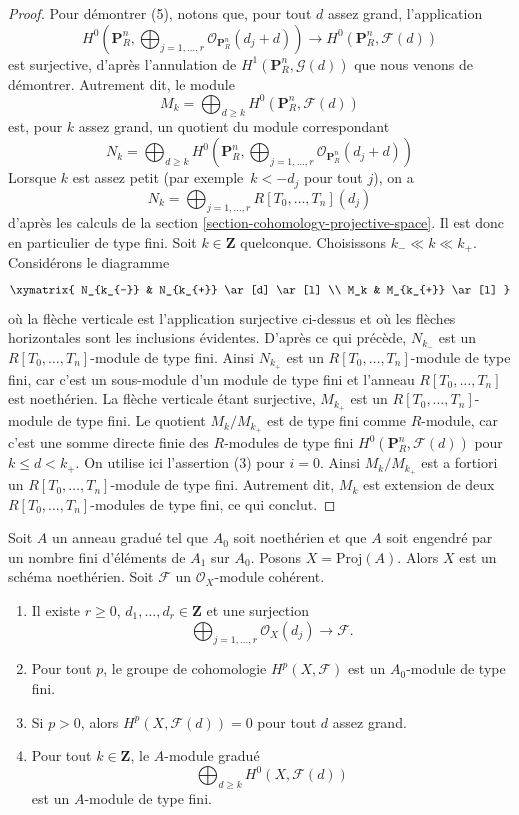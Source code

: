 \begin{proof}
\medskip\noindent
Pour démontrer (5), notons que, pour tout $d$
assez grand, l'application
$$
H^0(\mathbf{P}^n_R, \bigoplus\nolimits_{j = 1, \ldots, r}
\mathcal{O}_{\mathbf{P}^n_R}(d_j + d))
\to
H^0(\mathbf{P}^n_R, \mathcal{F}(d))
$$
est surjective, d'après l'annulation de $H^1(\mathbf{P}^n_R, \mathcal{G}(d))$
que nous venons de démontrer. Autrement dit, le module
$$
M_k
=
\bigoplus\nolimits_{d \geq k} H^0(\mathbf{P}^n_R, \mathcal{F}(d))
$$
est, pour $k$ assez grand, un quotient du module correspondant
$$
N_k
=
\bigoplus\nolimits_{d \geq k} H^0(\mathbf{P}^n_R,
\bigoplus\nolimits_{j = 1, \ldots, r}
\mathcal{O}_{\mathbf{P}^n_R}(d_j + d)
)
$$
Lorsque $k$ est assez petit (par exemple\ $k < -d_j$ pour tout $j$), on a
$$
N_k = \bigoplus\nolimits_{j = 1, \ldots, r}
R[T_0, \ldots, T_n](d_j)
$$
d'après les calculs de la section \ref{section-cohomology-projective-space}.
Il est donc en particulier de type fini.
Soit $k \in \mathbf{Z}$ quelconque.
Choisissons $k_{-} \ll k \ll k_{+}$.
Considérons le diagramme
$$
\xymatrix{
N_{k_{-}} & N_{k_{+}} \ar[d] \ar[l] \\
M_k & M_{k_{+}} \ar[l]
}
$$
où la flèche verticale est l'application surjective ci-dessus
et où les flèches horizontales sont les
inclusions évidentes. D'après ce qui précède, $N_{k_{-}}$ est
un $R[T_0, \ldots, T_n]$-module de type fini. Ainsi $N_{k_{+}}$ est
un $R[T_0, \ldots, T_n]$-module de type
fini, car c'est un sous-module d'un module de type fini et l'anneau
$R[T_0, \ldots, T_n]$ est noethérien. La flèche
verticale étant surjective, $M_{k_{+}}$ est
un $R[T_0, \ldots, T_n]$-module de type fini. Le quotient
$M_k/M_{k_{+}}$ est de type fini comme $R$-module, car c'est une
somme directe finie des $R$-modules de type fini
$H^0(\mathbf{P}^n_R, \mathcal{F}(d))$ pour $k \leq d < k_{+}$.
On utilise ici l'assertion (3) pour $i = 0$. Ainsi
$M_k/M_{k_{+}}$ est a fortiori un $R[T_0, \ldots, T_n]$-module
de type fini. Autrement dit, $M_k$ est extension de deux
$R[T_0, \ldots, T_n]$-modules de type fini, ce qui conclut.
\end{proof}

\begin{lemma}
\label{lemma-coherent-on-proj}
Soit $A$ un anneau gradué tel que $A_0$ soit noethérien et que
$A$ soit engendré par un nombre fini d'éléments de $A_1$ sur $A_0$.
Posons $X = \text{Proj}(A)$. Alors $X$ est un schéma noethérien.
Soit $\mathcal{F}$ un $\mathcal{O}_X$-module cohérent.
\begin{enumerate}
\item Il existe $r \geq 0$,
$d_1, \ldots, d_r \in \mathbf{Z}$ et une surjection
$$
\bigoplus\nolimits_{j = 1, \ldots, r} \mathcal{O}_X(d_j)
\longrightarrow \mathcal{F}.
$$
\item Pour tout $p$, le groupe de cohomologie $H^p(X, \mathcal{F})$ est un
$A_0$-module de type fini.
\item Si $p > 0$, alors $H^p(X, \mathcal{F}(d)) = 0$ pour tout $d$ assez grand.
\item Pour tout $k \in \mathbf{Z}$, le $A$-module gradué
$$
\bigoplus\nolimits_{d \geq k} H^0(X, \mathcal{F}(d))
$$
est un $A$-module de type fini.
\end{enumerate}
\end{lemma}

